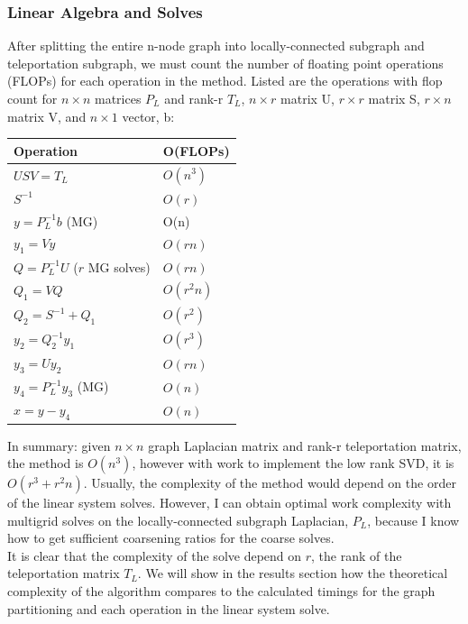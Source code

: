 \documentclass{article}
\begin{document}
\subsubsection{Linear Algebra and Solves}
After splitting the entire n-node graph into locally-connected subgraph and teleportation subgraph, we must count the number of floating point operations (FLOPs) for each operation in the method. Listed are the operations with flop count for $n\times n$ matrices $P_L$ and rank-r $T_L$, $n\times r$ matrix U, $r\times r$ matrix S, $r\times n$ matrix V, and $n\times 1$ vector, b:\\
\begin{spacing}{1}
\begin{center}
\renewcommand{\arraystretch}{1.5}
    \begin{tabular}{ | l | l |}
    \hline
    \textbf{Operation} & \textbf{O(FLOPs)} \\ \hline
    $USV = T_L$ & $O(n^3)$ \\ \hline
    $S^{-1}$ & $O(r)$ \\ \hline
    $y = P_L^{-1}b$ (MG) & O(n)  \\  \hline
    $y_1 = Vy$ & $O(rn)$ \\ \hline
    $Q = P_L^{-1}U$ ($r$ MG solves) & $O(rn)$ \\ \hline
    $Q_1 = VQ$ & $O(r^2 n)$ \\ \hline
    $Q_2 = S^{-1} + Q_1$ & $O(r^2)$ \\ \hline
    $y_2 = Q_2^{-1}y_1$ & $O(r^3)$ \\ \hline
    $y_3 = Uy_2$ & $O(rn)$ \\ \hline
    $y_4 = P_L^{-1}y_3$ (MG) & $O(n)$ \\ \hline
    $x = y - y_4$ & $O(n)$ \\
    \hline
    \end{tabular}
\end{center}
\end{spacing}
In summary: given $n\times n$ graph Laplacian matrix and rank-r teleportation matrix, the method is $O(n^3)$, however with work to implement the low rank SVD, it is $O(r^3+r^2 n)$. Usually, the complexity of the method would depend on the order of the linear system solves. However, I can obtain optimal work complexity with multigrid solves on the locally-connected subgraph Laplacian, $P_L$, because I know how to get sufficient coarsening ratios for the coarse solves.\\
It is clear that the complexity of the solve depend on $r$, the rank of the teleportation matrix $T_L$. We will show in the results section how the theoretical complexity of the algorithm compares to the calculated timings for the graph partitioning and each operation in the linear system solve.





%
%
\end{document}
